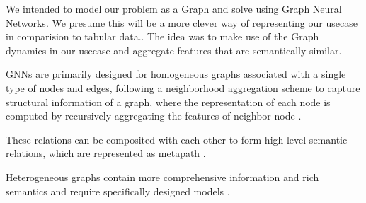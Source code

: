 \documentclass{report} %
\begin{document}
We intended to model our problem as a Graph and solve using Graph Neural Networks. 
We presume this will be a more clever way of representing our usecase in comparision to tabular data..
The idea was to make use of the Graph dynamics in our usecase and aggregate features that are semantically similar.

GNNs are primarily designed for homogeneous graphs associated with a single type of nodes
and edges, following a neighborhood aggregation scheme to capture structural information of a graph, where the representation 
of each node is computed by recursively aggregating the features of neighbor node \cite{02}.

These relations can be composited with each other to form high-level semantic relations, which are represented as metapath \cite{02}.

Heterogeneous graphs contain more comprehensive information and rich semantics and require specifically designed models  \cite{02}.




\end{document}

